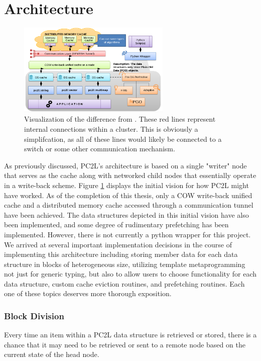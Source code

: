 \section{Architecture}
\begin{figure}[h]
\centering
\includegraphics[width=0.65\textwidth]{Figures/pc2l_architecture.png}
\caption{Visualization of the difference from \cite{dist_java}. These red lines represent internal connections within a cluster. This is obviously a simplifcation, as all of these lines would likely be connected to a switch or some other communication mechanism.}
\label{fig:pc2l_architecture}
\end{figure}
As previously discussed, PC2L's architecture is based on a single "writer" node that serves as the cache along with networked child nodes that essentially operate in a write-back scheme. Figure \ref{fig:pc2l_architecture} displays the initial vision for how PC2L might have worked. As of the completion of this thesis,  only a COW write-back unified cache and a distributed memory cache accessed through a communication tunnel have been achieved. The data structures depicted in this initial vision have also been implemented, and some degree of rudimentary prefetching has been implemented. However, there is not currently a python wrapper for this project. We arrived at several important implementation decisions in the course of implementing this architecture including storing member data for each data structure in blocks of heterogeneous size, utilizing template metaprogramming not just for generic typing, but also to allow users to choose functionality for each data structure, custom cache eviction routines, and prefetching routines. Each one of these topics deserves more thorough exposition. 

\subsubsection{Block Division}
Every time an item within a PC2L data structure is retrieved or stored, there is a chance that it may need to be retrieved or sent to a remote node based on the current state of the head node. 
